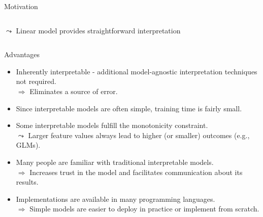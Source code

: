 \documentclass[11pt,compress,t,notes=noshow, aspectratio=169, xcolor=table]{beamer}
\begin{document}
\begin{frame}{Motivation}
\begin{columns}[T]
\begin{column}{0.45\textwidth}
  \begin{center}
    $\leadsto$ Linear model provides straightforward interpretation
  \end{center}
    \end{column}
\end{columns}
\end{frame}

\begin{frame}{Advantages}

    \begin{itemize}[<+->]
    \itemsep1em
        \item Inherently interpretable - additional model-agnostic interpretation techniques not required.\\
        $\Rightarrow$ Eliminates a source of error.
        \item Since interpretable models are often simple, training time is fairly small.
        \item Some interpretable models fulfill the monotonicity constraint.\\
        $\leadsto$ Larger feature values always lead to higher (or smaller) outcomes (e.g., GLMs).
        \item Many people are familiar with traditional interpretable models.\\
        $\Rightarrow$ Increases trust in the model and facilitates communication about its results.
        \item Implementations are available in many programming languages. \\
        $\Rightarrow$ Simple models are easier to deploy in practice or implement from scratch.
    \end{itemize}

\end{frame}
\end{document}
